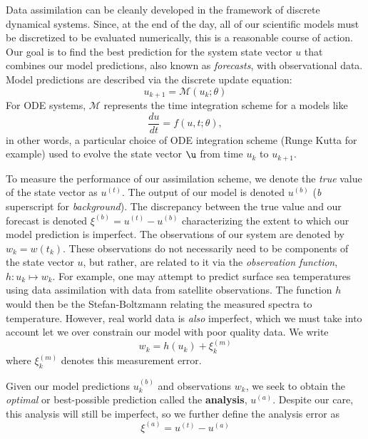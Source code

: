 Data assimilation can be cleanly developed in the framework of discrete dynamical systems. Since, at the end of the day, all of our scientific models must be discretized to be evaluated numerically, this is a reasonable course of action. Our goal is to find the best prediction for the system state vector $u$ that combines our model predictions, also known as \textit{forecasts}, with observational data. Model predictions are described via the discrete update equation:
\begin{equation}
    u_{k+1} = \mathcal{M}(u_k; \theta)
\end{equation}
For ODE systems, $\mathcal{M}$ represents the time integration scheme for a models like
\begin{equation}
    \dfrac{du}{dt} = f(u, t; \theta),
\end{equation}
in other words, a particular choice of ODE integration scheme (Runge Kutta for example) used to evolve the state vector $\u$ from time $u_k$ to $u_{k+1}$.

To measure the performance of our assimilation scheme, we denote the \textit{true} value of the state vector as $u^{(t)}$. The output of our model is denoted $u^{(b)}$ (\textit{b} superscript for \textit{background}). The discrepancy between the true value and our forecast is denoted $\xi^{(b)} = u^{(t)} - u^{(b)}$ characterizing the extent to which our model prediction is imperfect. The observations of our system are denoted by $w_k = w(t_k)$. These observations do not necessarily need to be components of the state vector $u$, but rather, are related to it via the \textit{observation function}, $h:u_k\mapsto w_k$. For example, one may attempt to predict surface sea temperatures using data assimilation with data from satellite observations. The function $h$ would then be the Stefan-Boltzmann relating the measured spectra to temperature. However, real world data is \textit{also} imperfect, which we must take into account let we over constrain our model with poor quality data. We write
\begin{equation}
    w_k = h(u_k) + \xi_k^{(m)}
\end{equation}
where $\xi_k^{(m)}$ denotes this measurement error.

Given our model predictions $u_{k}^{(b)}$ and observations $w_k$, we seek to obtain the \textit{optimal} or best-possible prediction called the \textbf{analysis}, $u^{(a)}$. Despite our care, this analysis will still be imperfect, so we further define the analysis error as
\begin{equation}
\xi^{(a)} = u^{(t)} - u^{(a)}
\end{equation}

